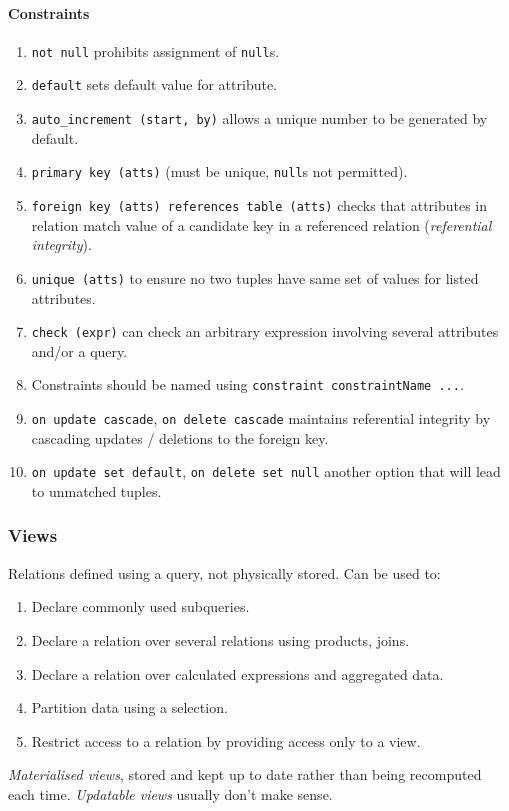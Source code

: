 \documentclass[twocolumn,english]{article}
\begin{document}
\paragraph{Constraints}
\begin{enumerate}
\item \texttt{not null} prohibits assignment of \texttt{null}s.
\item \texttt{default} sets default value for attribute.
\item \texttt{auto\_increment (start, by)} allows a unique number to be
generated by default.
\item \texttt{primary key (atts)} (must be unique, \texttt{null}s not permitted).
\item \texttt{foreign key (atts) references table (atts)} checks that attributes
in relation match value of a candidate key in a referenced relation
(\emph{referential integrity}).
\item \texttt{unique (atts)} to ensure no two tuples have same set of values
for listed attributes.
\item \texttt{check (expr)} can check an arbitrary expression involving
several attributes and/or a query.
\item Constraints should be named using \texttt{constraint constraintName
...}.
\item \texttt{on update cascade}, \texttt{on delete cascade} maintains referential
integrity by cascading updates / deletions to the foreign key.
\item \texttt{on update set default}, \texttt{on delete set null} another
option that will lead to unmatched tuples.
\end{enumerate}

\subsubsection{Views}

Relations defined using a query, not physically stored. Can be used
to:
\begin{enumerate}
\item Declare commonly used subqueries.
\item Declare a relation over several relations using products, joins.
\item Declare a relation over calculated expressions and aggregated data.
\item Partition data using a selection.
\item Restrict access to a relation by providing access only to a view.
\end{enumerate}
\emph{Materialised views}, stored and kept up to date rather than
being recomputed each time. \emph{Updatable views} usually don't make
sense.
\end{document}
